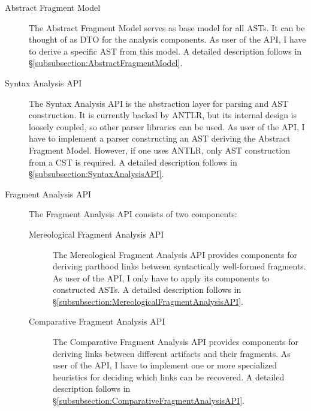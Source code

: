 \begin{description}

\item[Abstract Fragment Model]
The Abstract Fragment Model serves as base model for all \glspl{AST}.
It can be thought of as \gls{DTO} for the analysis components.
As user of the \gls{API}, I have to derive a specific \gls{AST} from this model.
A detailed description follows in §\ref{subsubsection:AbstractFragmentModel}.

\item[Syntax Analysis API]
The Syntax Analysis \gls{API} is the abstraction layer for parsing and \gls{AST} construction.
It is currently backed by \gls{ANTLR}, but its internal design is loosely coupled, so other parser libraries can be used.
As user of the \gls{API}, I have to implement a parser constructing an \gls{AST} deriving the Abstract Fragment Model.
However, if one uses \gls{ANTLR}, only \gls{AST} construction from a \gls{CST} is required.
A detailed description follows in §\ref{subsubsection:SyntaxAnalysisAPI}.

\item[Fragment Analysis API]
The Fragment Analysis \gls{API} consists of two components:
\begin{description}

\item[Mereological Fragment Analysis API]
The Mereological Fragment Analysis \gls{API} provides components for deriving parthood links between syntactically well-formed fragments.
As user of the \gls{API}, I only have to apply its components to constructed \glspl{AST}.
A detailed description follows in §\ref{subsubsection:MereologicalFragmentAnalysisAPI}.

\item[Comparative Fragment Analysis API]
The Comparative Fragment Analysis \gls{API} provides components for deriving links between different artifacts and their fragments.
As user of the \gls{API}, I have to implement one or more specialized heuristics for deciding which links can be recovered.
A detailed description follows in §\ref{subsubsection:ComparativeFragmentAnalysisAPI}.

\end{description}

\end{description}

